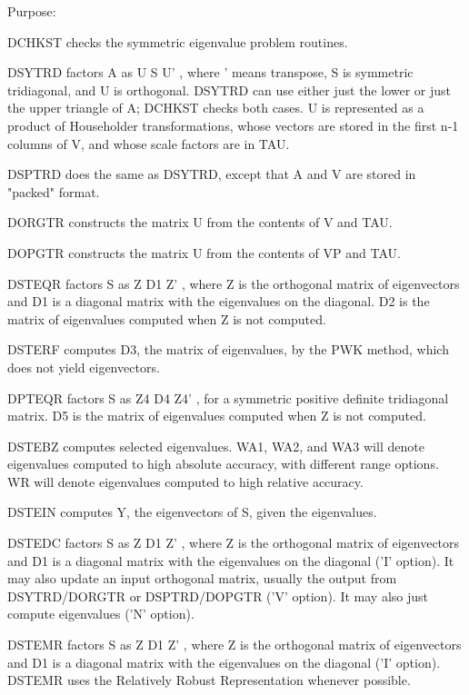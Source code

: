 \begin{DoxyParagraph}{Purpose\+: }
\begin{DoxyVerb} DCHKST  checks the symmetric eigenvalue problem routines.

    DSYTRD factors A as  U S U' , where ' means transpose,
    S is symmetric tridiagonal, and U is orthogonal.
    DSYTRD can use either just the lower or just the upper triangle
    of A; DCHKST checks both cases.
    U is represented as a product of Householder
    transformations, whose vectors are stored in the first
    n-1 columns of V, and whose scale factors are in TAU.

    DSPTRD does the same as DSYTRD, except that A and V are stored
    in "packed" format.

    DORGTR constructs the matrix U from the contents of V and TAU.

    DOPGTR constructs the matrix U from the contents of VP and TAU.

    DSTEQR factors S as  Z D1 Z' , where Z is the orthogonal
    matrix of eigenvectors and D1 is a diagonal matrix with
    the eigenvalues on the diagonal.  D2 is the matrix of
    eigenvalues computed when Z is not computed.

    DSTERF computes D3, the matrix of eigenvalues, by the
    PWK method, which does not yield eigenvectors.

    DPTEQR factors S as  Z4 D4 Z4' , for a
    symmetric positive definite tridiagonal matrix.
    D5 is the matrix of eigenvalues computed when Z is not
    computed.

    DSTEBZ computes selected eigenvalues.  WA1, WA2, and
    WA3 will denote eigenvalues computed to high
    absolute accuracy, with different range options.
    WR will denote eigenvalues computed to high relative
    accuracy.

    DSTEIN computes Y, the eigenvectors of S, given the
    eigenvalues.

    DSTEDC factors S as Z D1 Z' , where Z is the orthogonal
    matrix of eigenvectors and D1 is a diagonal matrix with
    the eigenvalues on the diagonal ('I' option). It may also
    update an input orthogonal matrix, usually the output
    from DSYTRD/DORGTR or DSPTRD/DOPGTR ('V' option). It may
    also just compute eigenvalues ('N' option).

    DSTEMR factors S as Z D1 Z' , where Z is the orthogonal
    matrix of eigenvectors and D1 is a diagonal matrix with
    the eigenvalues on the diagonal ('I' option).  DSTEMR
    uses the Relatively Robust Representation whenever possible.


\end{DoxyVerb}
\end{DoxyParagraph}
